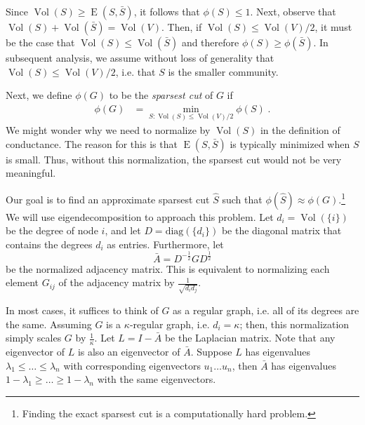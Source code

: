 Since $\operatorname{Vol}(S) \geq \operatorname{E}(S, \bar{S})$, it follows that $\phi(S) \leq 1$. Next, observe that $\operatorname{Vol}(S) + \operatorname{Vol}(\bar{S}) = \operatorname{Vol}(V)$. Then, if $\operatorname{Vol}(S) \leq \operatorname{Vol}(V)/2$, it must be the case that $\operatorname{Vol}(S) \leq \operatorname{Vol}(\bar{S})$ and therefore $\phi(S) \geq \phi(\bar{S})$. In subsequent analysis, we assume without loss of generality that $\operatorname{Vol}(S) \leq \operatorname{Vol}(V)/2$, i.e. that $S$ is the smaller community.

Next, we define $\phi(G)$ to be the {\it sparsest cut} of $G$ if
\begin{align}
    \phi(G) &= \min_{S: \operatorname{Vol}(S) \leq \operatorname{Vol}(V)/2} \phi(S) \;.
\end{align}
We might wonder why we need to normalize by $\operatorname{Vol}(S)$ in the definition of conductance. The reason for this is that $\operatorname{E}(S, \bar{S})$ is typically minimized when $S$ is small. Thus, without this normalization, the sparsest cut would not be very meaningful.

Our goal is to find an approximate sparsest cut $\hat{S}$ such that $\phi(\hat{S}) \approx \phi(G)$.\footnote{Finding the exact sparsest cut is a computationally hard problem.} We will use eigendecomposition to approach this problem. Let $d_i = \operatorname{Vol}(\{i\})$ be the degree of node $i$, and let $D = \text{diag}(\{d_i\})$ be the diagonal matrix that contains the degrees $d_i$ as entries. Furthermore, let 
\begin{equation}
    \bar{A} = D^{-\frac{1}{2}} G D^{\frac{1}{2}}
\end{equation}
be the normalized adjacency matrix. This is equivalent to normalizing each element $G_{ij}$ of the adjacency matrix by $\frac{1}{\sqrt{d_i d_j}}$.

In most cases, it suffices to think of $G$ as a regular graph, i.e. all of its degrees are the same. Assuming $G$ is a $\kappa$-regular graph, i.e. $d_i = \kappa$; then, this normalization simply scales $G$ by $\frac{1}{\kappa}$. Let $L = I - \bar{A}$ be the Laplacian matrix. Note that any eigenvector of $L$ is also an eigenvector of $\bar{A}$. Suppose $L$ has eigenvalues $\lambda_1 \leq \hdots \leq \lambda_n$ with corresponding eigenvectors $u_1 \hdots u_n$, then $\bar{A}$ has eigenvalues $1 - \lambda_1 \geq \hdots \geq 1 - \lambda_n$ with the same eigenvectors.

